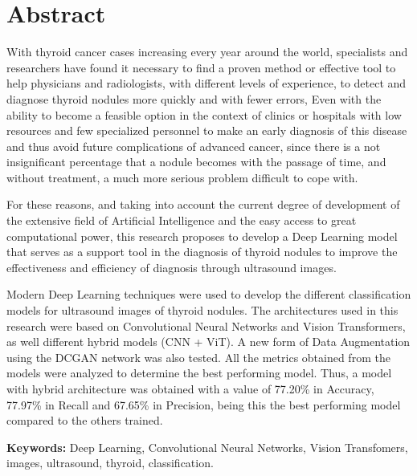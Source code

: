 \clearpage
\chapter*{Abstract}
With thyroid cancer cases increasing every year around the world,  specialists and researchers have found it necessary to find a proven method or effective tool to help physicians and radiologists, with different levels of experience, to detect and diagnose thyroid nodules more quickly and with fewer errors, Even with the ability to become a feasible option in the context of clinics or hospitals with low resources and few specialized personnel to make an early diagnosis of this disease and thus avoid future complications of advanced cancer, since there is a not insignificant percentage that a nodule becomes with the passage of time, and without treatment, a much more serious problem difficult to cope with. 

For these reasons, and taking into account the current degree of development of the extensive field of Artificial Intelligence and the easy access to great computational power, this research proposes to develop a Deep Learning model that serves as a support tool in the diagnosis of thyroid nodules to improve the effectiveness and efficiency of diagnosis through ultrasound images.

Modern Deep Learning techniques were used to develop the different classification models for ultrasound images of thyroid nodules. The architectures used in this research were based on Convolutional Neural Networks and Vision Transformers, as well different hybrid models (CNN + ViT). A new form of Data Augmentation using the DCGAN network was also tested. All the metrics obtained from the models were analyzed to determine the best performing model. Thus, a model with hybrid architecture was obtained with a value of 77.20\% in Accuracy, 77.97\% in Recall and 67.65\% in Precision, being this the best performing model compared to the others trained.
\newline

\textbf{Keywords: } Deep Learning, Convolutional Neural Networks, Vision Transfomers, images, ultrasound, thyroid, classification.
